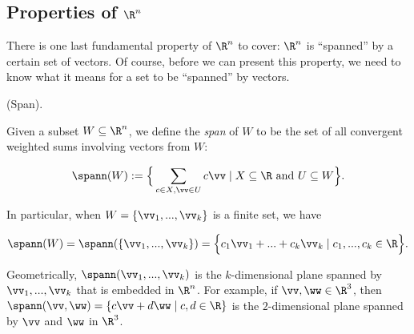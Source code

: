 \subsection*{Properties of $\R^n$}

There is one last fundamental property of $\R^n$ to cover: $\R^n$ is ``spanned'' by a certain set of vectors. Of course, before we can present this property, we need to know what it means for a set to be ``spanned'' by vectors.

\begin{defn}
    (Span).
    
    Given a subset $W \subseteq \R^n$, we define the \textit{span} of $W$ to be the set of all convergent weighted sums involving vectors from $W$:
    
    \begin{align*}
        \spann(W) := \Big\{ \sum_{c \in X, \vv \in U} c \vv \mid X \subseteq \R \text{ and } U \subseteq W \Big\}.
    \end{align*}
    
    In particular, when $W = \{\vv_1, ..., \vv_k\}$ is a finite set, we have
    
    \begin{align*}
        \spann(W) = \spann(\{\vv_1, ..., \vv_k\}) = \Big\{ c_1 \vv_1 + ... + c_k \vv_k \mid c_1, ..., c_k \in \R \Big\}.
    \end{align*}
    
    Geometrically, $\spann(\vv_1, ..., \vv_k)$ is the $k$-dimensional plane spanned by $\vv_1, ..., \vv_k$ that is embedded in $\R^n$. For example, if $\vv, \ww \in \R^3$, then $\spann(\vv, \ww) = \{ c \vv + d \ww \mid c, d \in \R \}$ is the $2$-dimensional plane spanned by $\vv$ and $\ww$ in $\R^3$.
\end{defn}

